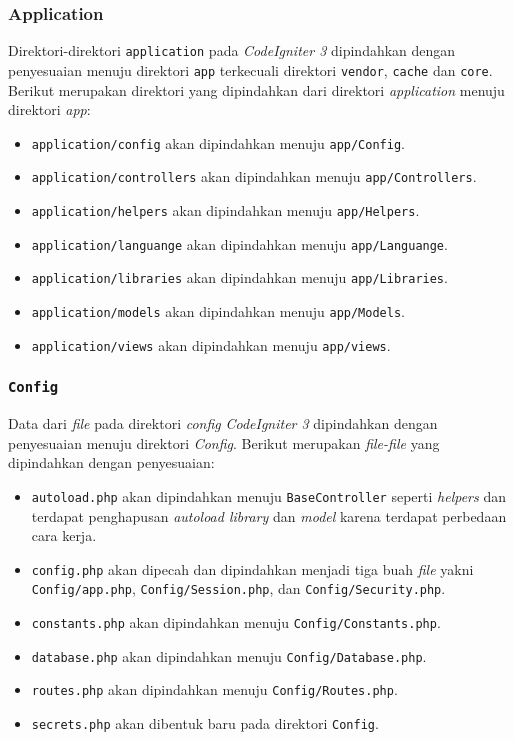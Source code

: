 \subsubsection{Application}
Direktori-direktori \texttt{application} pada \textit{CodeIgniter 3} dipindahkan dengan penyesuaian menuju direktori \texttt{app} terkecuali direktori \texttt{vendor}, \texttt{cache} dan \texttt{core}. Berikut merupakan direktori yang dipindahkan dari direktori \textit{application} menuju direktori \textit{app}:
\begin{itemize}
\item \verb|application/config| akan dipindahkan menuju \texttt{app/Config}.
\item \verb|application/controllers| akan dipindahkan menuju \texttt{app/Controllers}.
\item \verb|application/helpers| akan dipindahkan menuju \texttt{app/Helpers}.
\item \verb|application/languange| akan dipindahkan menuju \texttt{app/Languange}.
\item \verb|application/libraries| akan dipindahkan menuju \texttt{app/Libraries}.
\item \verb|application/models| akan dipindahkan menuju \texttt{app/Models}.
\item \verb|application/views| akan dipindahkan menuju \texttt{app/views}.
\end{itemize}

\subsubsection{\texttt{Config}}
\label{subsubsec:configbab3usulan}
Data dari \textit{file} pada direktori \textit{config} \textit{CodeIgniter 3} dipindahkan dengan penyesuaian menuju direktori \textit{Config}. Berikut merupakan \textit{file-file} yang dipindahkan dengan penyesuaian:
\begin{itemize}
	\item \verb|autoload.php| akan dipindahkan menuju \texttt{BaseController} seperti \textit{helpers} dan terdapat penghapusan \textit{autoload library} dan \textit{model} karena terdapat perbedaan cara kerja.
	\item \verb|config.php| akan dipecah dan dipindahkan menjadi tiga buah \textit{file} yakni \texttt{Config/app.php}, \texttt{Config/Session.php}, dan \texttt{Config/Security.php}.
	\item \verb|constants.php| akan dipindahkan menuju \texttt{Config/Constants.php}.
	\item \verb|database.php| akan dipindahkan menuju \texttt{Config/Database.php}.
	\item \verb|routes.php| akan dipindahkan menuju \texttt{Config/Routes.php}.
	\item \verb|secrets.php| akan dibentuk baru pada direktori \texttt{Config}.
\end{itemize}

